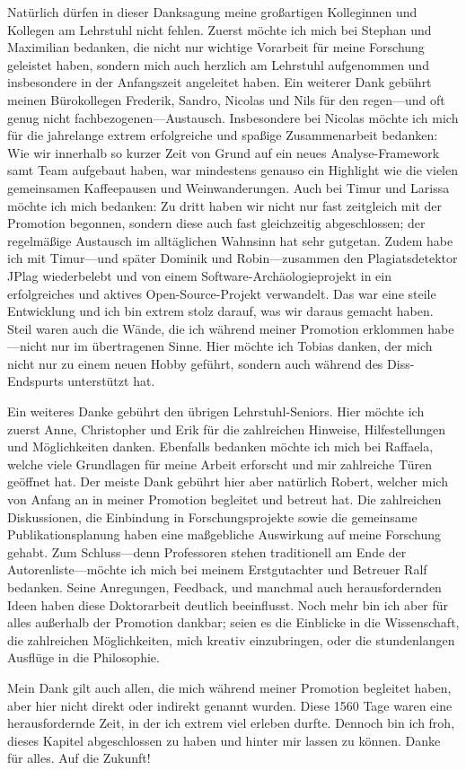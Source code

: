 {Natürlich dürfen in dieser Danksagung meine großartigen Kolleginnen und Kollegen am Lehrstuhl nicht fehlen.
Zuerst möchte ich mich bei Stephan und Maximilian bedanken, die nicht nur wichtige Vorarbeit für meine Forschung geleistet haben, sondern mich auch herzlich am Lehrstuhl aufgenommen und insbesondere in der Anfangszeit angeleitet haben.
Ein weiterer Dank gebührt meinen Bürokollegen Frederik, Sandro, Nicolas und Nils für den regen---und oft genug nicht fachbezogenen---Austausch.
Insbesondere bei Nicolas möchte ich mich für die jahrelange extrem erfolgreiche und spaßige Zusammenarbeit bedanken: Wie wir innerhalb so kurzer Zeit von Grund auf ein neues Analyse-Framework samt Team aufgebaut haben, war mindestens genauso ein Highlight wie die vielen gemeinsamen Kaffeepausen und Weinwanderungen.
Auch bei Timur und Larissa möchte ich mich bedanken: Zu dritt haben wir nicht nur fast zeitgleich mit der Promotion begonnen, sondern diese auch fast gleichzeitig abgeschlossen; der regelmäßige Austausch im alltäglichen Wahnsinn hat sehr gutgetan.
Zudem habe ich mit Timur---und später Dominik und Robin---zusammen den Plagiatsdetektor JPlag wiederbelebt und von einem Software-Archäologieprojekt in ein erfolgreiches und aktives Open-Source-Projekt verwandelt.
Das war eine steile Entwicklung und ich bin extrem stolz darauf, was wir daraus gemacht haben.
Steil waren auch die Wände, die ich während meiner Promotion erklommen habe---nicht nur im übertragenen Sinne.
Hier möchte ich Tobias danken, der mich nicht nur zu einem neuen Hobby geführt, sondern auch während des Diss-Endspurts unterstützt hat.

Ein weiteres Danke gebührt den übrigen Lehrstuhl-Seniors.
Hier möchte ich zuerst Anne, Christopher und Erik für die zahlreichen Hinweise, Hilfestellungen und Möglichkeiten danken.
Ebenfalls bedanken möchte ich mich bei Raffaela, welche viele Grundlagen für meine Arbeit erforscht und mir zahlreiche Türen geöffnet hat.
Der meiste Dank gebührt hier aber natürlich Robert, welcher mich von Anfang an in meiner Promotion begleitet und betreut hat.
Die zahlreichen Diskussionen, die Einbindung in Forschungsprojekte sowie die gemeinsame Publikationsplanung haben eine maßgebliche Auswirkung auf meine Forschung gehabt.
Zum Schluss---denn Professoren stehen traditionell am Ende der Autorenliste---möchte ich mich bei meinem Erstgutachter und Betreuer Ralf bedanken.
Seine Anregungen, Feedback, und manchmal auch herausfordernden Ideen haben diese Doktorarbeit deutlich beeinflusst.
Noch mehr bin ich aber für alles außerhalb der Promotion dankbar; seien es die Einblicke in die Wissenschaft, die zahlreichen Möglichkeiten, mich kreativ einzubringen, oder die stundenlangen Ausflüge in die Philosophie.

Mein Dank gilt auch allen, die mich während meiner Promotion begleitet haben, aber hier nicht direkt oder indirekt genannt wurden.
Diese 1560 Tage waren eine herausfordernde Zeit, in der ich extrem viel erleben durfte.
Dennoch bin ich froh, dieses Kapitel abgeschlossen zu haben und hinter mir lassen zu können.
Danke für alles. Auf die Zukunft!
%
}
